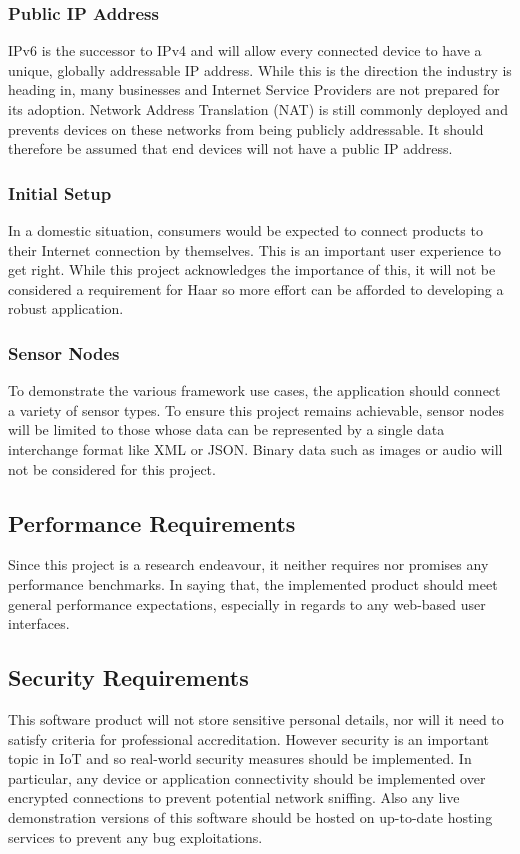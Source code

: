       \subsubsection{Public IP Address}
        IPv6 is the successor to IPv4 and will allow every connected device to have a unique, globally addressable IP address. While this is the direction the industry is heading in, many businesses and Internet Service Providers are not prepared for its adoption. Network Address Translation (NAT) is still commonly deployed and prevents devices on these networks from being publicly addressable. It should therefore be assumed that end devices will not have a public IP address.

      \subsubsection{Initial Setup}
        In a domestic situation, consumers would be expected to connect products to their Internet connection by themselves. This is an important user experience to get right. While this project acknowledges the importance of this, it will not be considered a requirement for Haar so more effort can be afforded to developing a robust application.

      \subsubsection{Sensor Nodes}
        To demonstrate the various framework use cases, the application should connect a variety of sensor types. To ensure this project remains achievable, sensor nodes will be limited to those whose data can be represented by a single data interchange format like XML or JSON. Binary data such as images or audio will not be considered for this project.

    \subsection{Performance Requirements}
      Since this project is a research endeavour, it neither requires nor promises any performance benchmarks. In saying that, the implemented product should meet general performance expectations, especially in regards to any web-based user interfaces.

    \subsection{Security Requirements}
      This software product will not store sensitive personal details, nor will it need to satisfy criteria for professional accreditation. However security is an important topic in IoT and so real-world security measures should be implemented. In particular, any device or application connectivity should be implemented over encrypted connections to prevent potential network sniffing. Also any live demonstration versions of this software should be hosted on up-to-date hosting services to prevent any bug exploitations.

